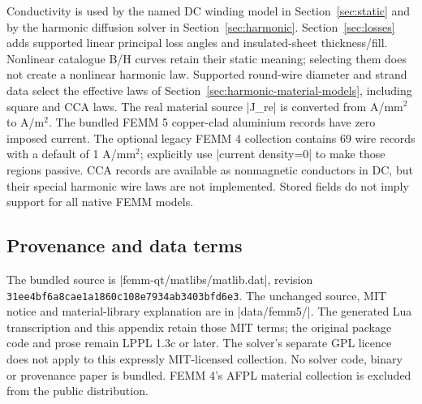 Conductivity is used by the named DC winding model in
Section~\ref{sec:static} and by the harmonic diffusion solver in
Section~\ref{sec:harmonic}. Section~\ref{sec:losses} adds supported linear principal loss angles and
insulated-sheet thickness/fill. Nonlinear catalogue B/H curves retain their
static meaning; selecting them does not create a nonlinear harmonic law.
Supported round-wire diameter and strand data select the effective laws of
Section~\ref{sec:harmonic-material-models}, including square and CCA laws. The real material source |J_re| is converted from A/mm$^2$ to A/m$^2$.
The bundled FEMM 5 copper-clad aluminium records have zero imposed current.
The optional legacy FEMM 4 collection contains 69 wire records with a default
of 1 A/mm$^2$; explicitly use |current density=0| to make those regions passive.
CCA records are available as nonmagnetic conductors in DC, but their special
harmonic wire laws are not implemented. Stored fields do not imply support for
all native FEMM models.

\subsection{Provenance and data terms}
The bundled source is |femm-qt/matlibs/matlib.dat|, revision
\nolinkurl{31ee4bf6a8cae1a1860c108e7934ab3403bfd6e3}.
The unchanged source, MIT notice and material-library explanation are in
|data/femm5/|. The generated Lua transcription and this appendix retain those
MIT terms; the original package code and prose remain LPPL 1.3c or later.
The solver's separate GPL licence does not apply to this expressly MIT-licensed
collection. No solver code, binary or provenance paper is bundled.
FEMM 4's AFPL material collection is excluded from the public distribution.
